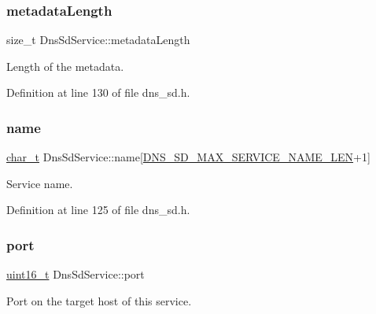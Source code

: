 \mbox{\label{structDnsSdService_a09d63607034e43aa05f059e1e0ba3e81}} 
\subsubsection{\texorpdfstring{metadata\+Length}{metadataLength}}
{\footnotesize\ttfamily size\+\_\+t Dns\+Sd\+Service\+::metadata\+Length}



Length of the metadata. 



Definition at line 130 of file dns\+\_\+sd.\+h.

\mbox{\label{structDnsSdService_abc60a53b69dd0843ceefa6e7a7b0443c}} 
\subsubsection{\texorpdfstring{name}{name}}
{\footnotesize\ttfamily \hyperlink{compiler__port_8h_a40bb5262bf908c328fbcfbe5d29d0201}{char\+\_\+t} Dns\+Sd\+Service\+::name\mbox{[}\hyperlink{dns__sd_8h_a3338b6aea1abcee2bd66fa62c1f1bbdf}{D\+N\+S\+\_\+\+S\+D\+\_\+\+M\+A\+X\+\_\+\+S\+E\+R\+V\+I\+C\+E\+\_\+\+N\+A\+M\+E\+\_\+\+L\+EN}+1\mbox{]}}



Service name. 



Definition at line 125 of file dns\+\_\+sd.\+h.

\mbox{\label{structDnsSdService_abf6fd1a073f7294ec927abb9b676c86a}} 
\subsubsection{\texorpdfstring{port}{port}}
{\footnotesize\ttfamily \hyperlink{stdint_8h_a273cf69d639a59973b6019625df33e30}{uint16\+\_\+t} Dns\+Sd\+Service\+::port}



Port on the target host of this service. 



